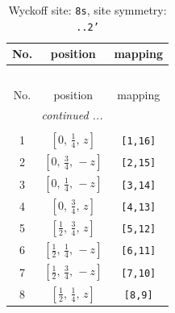 \documentclass[fleqn,8pt]{jsarticle}
\begin{document}
\begin{longtable}{ccc}
\caption{Wyckoff site: {\tt 8s}, site symmetry: {\tt ..2'}}
 \\
 \hline \hline
No. & position & mapping \\ \hline \endfirsthead

\multicolumn{2}{l}{\tablename\ \thetable{}} \\
 \hline \hline
No. & position & mapping \\ \hline \endhead

 \hline \hline
\multicolumn{2}{r}{\footnotesize\it continued ...} \\ \endfoot

 \hline \hline
\multicolumn{2}{r}{} \\ \endlastfoot

1 & $\left[ 0,\, \frac{1}{4},\, z \right]$ & {\tt [1,16]} \\ \hline
2 & $\left[ 0,\, \frac{3}{4},\, - z \right]$ & {\tt [2,15]} \\ \hline
3 & $\left[ 0,\, \frac{1}{4},\, - z \right]$ & {\tt [3,14]} \\ \hline
4 & $\left[ 0,\, \frac{3}{4},\, z \right]$ & {\tt [4,13]} \\ \hline
5 & $\left[ \frac{1}{2},\, \frac{3}{4},\, z \right]$ & {\tt [5,12]} \\ \hline
6 & $\left[ \frac{1}{2},\, \frac{1}{4},\, - z \right]$ & {\tt [6,11]} \\ \hline
7 & $\left[ \frac{1}{2},\, \frac{3}{4},\, - z \right]$ & {\tt [7,10]} \\ \hline
8 & $\left[ \frac{1}{2},\, \frac{1}{4},\, z \right]$ & {\tt [8,9]} \\
\end{longtable}
\renewcommand{\arraystretch}{1.2}
\end{document}
